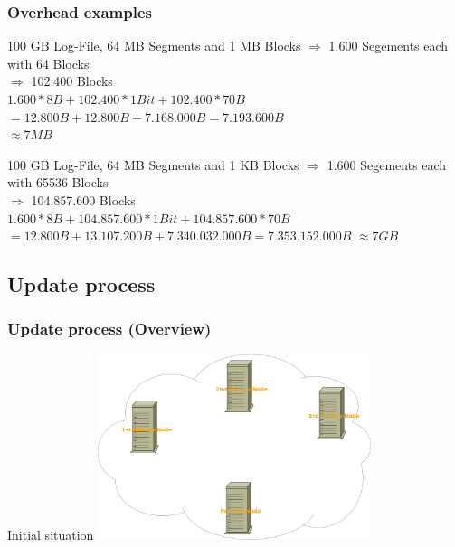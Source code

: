 \documentclass{beamer}
\begin{document}
	\begin{frame}
		\frametitle{Overhead examples}

		\begin{exampleblock}{100 GB Log-File, 64 MB Segments and 1 MB Blocks}
			$\Rightarrow$ 1.600 Segements each with 64 Blocks\\
			$\Rightarrow$ 102.400 Blocks\\
			\vspace{0.3cm}
			$1.600 * 8 B + 102.400 * 1 Bit + 102.400 * 70 B$\\
			$= 12.800 B + 12.800 B + 7.168.000 B = 7.193.600 B$\\
			$\approx 7 MB$
		\end{exampleblock}

		\begin{exampleblock}{100 GB Log-File, 64 MB Segments and 1 KB Blocks}
			$\Rightarrow$ 1.600 Segements each with 65536 Blocks\\
			$\Rightarrow$ 104.857.600 Blocks\\
			\vspace{0.3cm}
			$1.600 * 8 B + 104.857.600 * 1 Bit + 104.857.600 * 70 B$\\
			$= 12.800 B + 13.107.200 B + 7.340.032.000 B = 7.353.152.000 B$
			$\approx 7 GB$
		\end{exampleblock}
	\end{frame}

\subsection{Update process}

	\begin{frame}
		\frametitle{Update process (Overview)}

		\begin{block}{Initial situation}
			\center\includegraphics[width=8cm]{./img/Log_Overview_00}
		\end{block}
	\end{frame}
\end{document}
